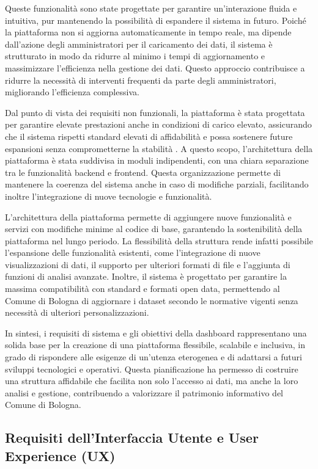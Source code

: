 Queste funzionalità sono state progettate per garantire un'interazione fluida e intuitiva, pur mantenendo la possibilità di espandere il sistema in futuro. Poiché la piattaforma non si aggiorna automaticamente in tempo reale, ma dipende dall’azione degli amministratori per il caricamento dei dati, il sistema è strutturato in modo da ridurre al minimo i tempi di aggiornamento e massimizzare l'efficienza nella gestione dei dati. Questo approccio contribuisce a ridurre la necessità di interventi frequenti da parte degli amministratori, migliorando l'efficienza complessiva.

Dal punto di vista dei requisiti non funzionali, la piattaforma è stata progettata per garantire elevate prestazioni anche in condizioni di carico elevato, assicurando che il sistema rispetti standard elevati di affidabilità e possa sostenere future espansioni senza comprometterne la stabilità \cite{feldmann2002scalability}. A questo scopo, l'architettura della piattaforma è stata suddivisa in moduli indipendenti, con una chiara separazione tra le funzionalità backend e frontend. Questa organizzazione permette di mantenere la coerenza del sistema anche in caso di modifiche parziali, facilitando inoltre l’integrazione di nuove tecnologie e funzionalità.

L'architettura della piattaforma permette di aggiungere nuove funzionalità e servizi con modifiche minime al codice di base, garantendo la sostenibilità della piattaforma nel lungo periodo. La flessibilità della struttura rende infatti possibile l’espansione delle funzionalità esistenti, come l'integrazione di nuove visualizzazioni di dati, il supporto per ulteriori formati di file e l’aggiunta di funzioni di analisi avanzate. Inoltre, il sistema è progettato per garantire la massima compatibilità con standard e formati open data, permettendo al Comune di Bologna di aggiornare i dataset secondo le normative vigenti senza necessità di ulteriori personalizzazioni.

In sintesi, i requisiti di sistema e gli obiettivi della dashboard rappresentano una solida base per la creazione di una piattaforma flessibile, scalabile e inclusiva, in grado di rispondere alle esigenze di un’utenza eterogenea e di adattarsi a futuri sviluppi tecnologici e operativi. Questa pianificazione ha permesso di costruire una struttura affidabile che facilita non solo l’accesso ai dati, ma anche la loro analisi e gestione, contribuendo a valorizzare il patrimonio informativo del Comune di Bologna.

\subsection{Requisiti dell’Interfaccia Utente e User Experience (UX)}

